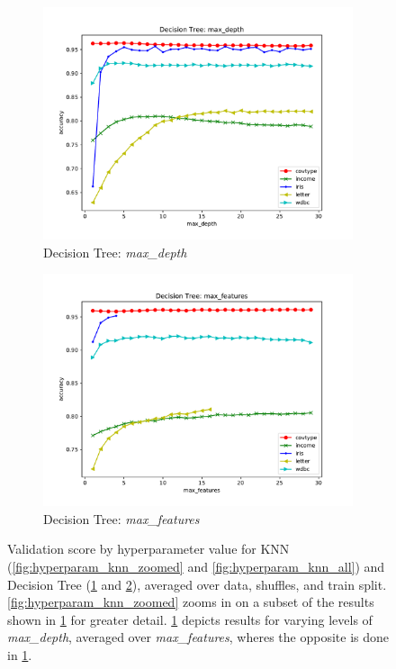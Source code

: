 \documentclass[twoside,11pt]{article}
\begin{document}
\begin{figure}[h]
				\begin{subfigure}[b]{.45\linewidth}
					\includegraphics[width=\linewidth]{dt_hyperparam_max_depth}
					\caption{Decision Tree: \textit{max\_depth}}
					\label{fig:hyperparam_dt_max_depth}
				\end{subfigure}
				\begin{subfigure}[b]{.45\linewidth}
					\includegraphics[width=\linewidth]{dt_hyperparam_max_features}
					\caption{Decision Tree: \textit{max\_features}}
					\label{fig:hyperparam_dt_max_features}
				\end{subfigure}
				
				\caption{Validation score by hyperparameter value for KNN (\ref{fig:hyperparam_knn_zoomed} and \ref{fig:hyperparam_knn_all}) and Decision Tree (\ref{fig:hyperparam_dt_max_depth} and \ref{fig:hyperparam_dt_max_features}), averaged over data, shuffles, and train split. \ref{fig:hyperparam_knn_zoomed} zooms in on a subset of the results shown in \ref{fig:hyperparam_dt_max_depth} for greater detail. \ref{fig:hyperparam_dt_max_depth} depicts results for varying levels of \textit{max\_depth}, averaged over \textit{max\_features}, wheres the opposite is done in \ref{fig:hyperparam_dt_max_depth}.}
				\label{fig:hyperparam_knn_dt}
			\end{figure}
			
\end{document}
